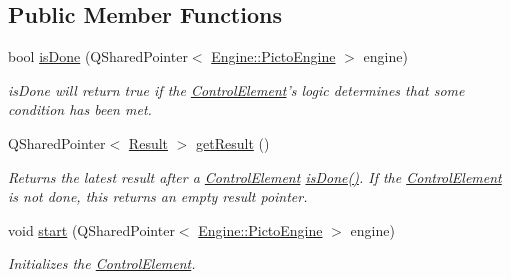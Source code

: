 \subsection*{Public Member Functions}
\begin{DoxyCompactItemize}
\item 
\hypertarget{class_picto_1_1_test_controller_a60da5e71238caac387ff2c43dbc2e6df}{bool \hyperlink{class_picto_1_1_test_controller_a60da5e71238caac387ff2c43dbc2e6df}{is\-Done} (Q\-Shared\-Pointer$<$ \hyperlink{class_picto_1_1_engine_1_1_picto_engine}{Engine\-::\-Picto\-Engine} $>$ engine)}\label{class_picto_1_1_test_controller_a60da5e71238caac387ff2c43dbc2e6df}

\begin{DoxyCompactList}\small\item\em is\-Done will return true if the \hyperlink{class_picto_1_1_control_element}{Control\-Element}'s logic determines that some condition has been met. \end{DoxyCompactList}\item 
\hypertarget{class_picto_1_1_test_controller_aabd1ea97e878f78a3487500cc0f09c9f}{Q\-Shared\-Pointer$<$ \hyperlink{class_picto_1_1_result}{Result} $>$ \hyperlink{class_picto_1_1_test_controller_aabd1ea97e878f78a3487500cc0f09c9f}{get\-Result} ()}\label{class_picto_1_1_test_controller_aabd1ea97e878f78a3487500cc0f09c9f}

\begin{DoxyCompactList}\small\item\em Returns the latest result after a \hyperlink{class_picto_1_1_control_element}{Control\-Element} \hyperlink{class_picto_1_1_test_controller_a60da5e71238caac387ff2c43dbc2e6df}{is\-Done()}. If the \hyperlink{class_picto_1_1_control_element}{Control\-Element} is not done, this returns an empty result pointer. \end{DoxyCompactList}\item 
void \hyperlink{class_picto_1_1_test_controller_a1a7e9f6071dace32af5bc50b251fccbc}{start} (Q\-Shared\-Pointer$<$ \hyperlink{class_picto_1_1_engine_1_1_picto_engine}{Engine\-::\-Picto\-Engine} $>$ engine)
\begin{DoxyCompactList}\small\item\em Initializes the \hyperlink{class_picto_1_1_control_element}{Control\-Element}. \end{DoxyCompactList}\end{DoxyCompactItemize}
